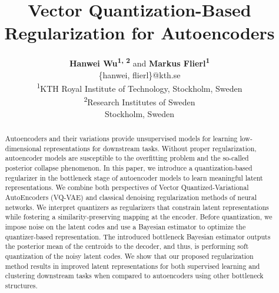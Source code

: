 \documentclass[letterpaper]{article} %
\title{Vector Quantization-Based Regularization for Autoencoders}
\author{\large \textbf{Hanwei Wu\textsuperscript{\rm 1, 2}} and
\textbf{Markus Flierl\textsuperscript{\rm 1}} \\
\{hanwei, flierl\}@kth.se \\
\textsuperscript{\rm 1}KTH Royal Institute of Technology, Stockholm, Sweden\\
\textsuperscript{\rm 2}Research Institutes of Sweden\\
Stockholm, Sweden}
\begin{document}
\maketitle
\begin{abstract}
Autoencoders and their variations provide unsupervised models for learning low-dimensional representations for downstream tasks. Without proper regularization, autoencoder models are susceptible to the overfitting problem and the so-called posterior collapse phenomenon. In this paper, we introduce a quantization-based regularizer in the bottleneck stage of autoencoder models to learn meaningful latent representations. We combine both perspectives of Vector Quantized-Variational AutoEncoders (VQ-VAE) and classical denoising regularization methods of neural networks. We interpret quantizers as regularizers that constrain latent representations while fostering a similarity-preserving mapping at the encoder. Before quantization, we impose noise on the latent codes and use a Bayesian estimator to optimize the quantizer-based representation. The introduced bottleneck Bayesian estimator outputs the posterior mean of the centroids to the decoder, and thus, is performing soft quantization of the noisy latent codes. We show that our proposed regularization method results in improved latent representations for both supervised learning and clustering downstream tasks when compared to autoencoders using other bottleneck structures.
\end{abstract}
\end{document}
